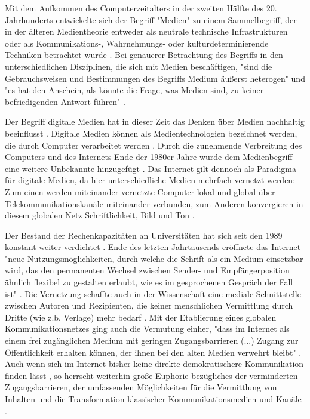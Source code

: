 Mit dem Aufkommen des Computerzeitalters in der zweiten Hälfte des 20. Jahrhunderts entwickelte sich der Begriff "Medien" zu einem Sammelbegriff, der in der älteren Medientheorie entweder als neutrale technische Infrastrukturen oder als Kommunikations-, Wahrnehmungs- oder kulturdeterminierende Techniken betrachtet wurde \cite{beck2005_Kommunikation}. Bei genauerer Betrachtung des Begriffs in den unterschiedlichen Disziplinen, die sich mit Medien beschäftigen, "sind die Gebrauchsweisen und Bestimmungen des Begriffs Medium äußerst heterogen" und "es hat den Anschein, als könnte die Frage, was Medien sind, zu keiner befriedigenden Antwort führen" \cite{Burkhardt_2015}.

Der Begriff digitale Medien hat in dieser Zeit das Denken über Medien nachhaltig beeinflusst  \cite{Burkhardt_2015}. Digitale Medien können als Medientechnologien bezeichnet werden, die durch Computer verarbeitet werden \cite{nunning_2013_metzler}. Durch die zunehmende Verbreitung des Computers und des Internets Ende der 1980er Jahre wurde dem Medienbegriff eine weitere Unbekannte hinzugefügt \cite{Burkhardt_2015}. Das Internet gilt dennoch als Paradigma für digitale Medien, da hier unterschiedliche Medien mehrfach vernetzt werden: Zum einen werden miteinander vernetzte Computer lokal und global über Telekommunikationskanäle miteinander verbunden, zum Anderen konvergieren in diesem globalen Netz Schriftlichkeit, Bild und Ton \cite{nunning_2013_metzler}.

Der Bestand der Rechenkapazitäten an Universitäten hat sich seit den 1989 konstant weiter verdichtet \cite{Rutenfranz_1997}. Ende des letzten Jahrtausends eröffnete das Internet "neue Nutzungsmöglichkeiten, durch welche die Schrift als ein Medium einsetzbar wird, das den permanenten Wechsel zwischen Sender- und Empfängerposition ähnlich flexibel zu gestalten erlaubt, wie es im gesprochenen Gespräch der Fall ist" \cite{sandbothe_2000_pragmatische}. Die Vernetzung schaffte auch in der Wissenschaft eine mediale Schnittstelle zwischen Autoren und Rezipienten, die keiner menschlichen Vermittlung durch Dritte (wie z.b. Verlage) mehr bedarf \cite{naeder_2010_open}. Mit der Etablierung eines globalen Kommunikationsnetzes ging auch die Vermutung einher, "dass im Internet als einem frei zugänglichen Medium mit geringen Zugangsbarrieren (...) Zugang zur Öffentlichkeit erhalten können, der ihnen bei den alten Medien verwehrt bleibt" \cite{Gerhards_2007}. Auch wenn sich im Internet bisher keine direkte demokratischere Kommunikation finden lässt \cite{Gerhards_2007}, so herrscht weiterhin große Euphorie bezügliches der verminderten Zugangsbarrieren, der umfassenden Möglichkeiten für die Vermittlung von Inhalten und die Transformation klassischer Kommunikationsmedien und Kanäle \cite{suchen}.

